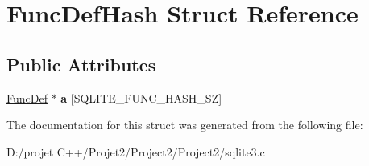 \hypertarget{struct_func_def_hash}{}\section{Func\+Def\+Hash Struct Reference}
\label{struct_func_def_hash}
\subsection*{Public Attributes}
\begin{DoxyCompactItemize}
\item 
\mbox{\label{struct_func_def_hash_aaab2cd9c5f40d92c236f8fdeb2d9849a}} 
\mbox{\hyperlink{struct_func_def}{Func\+Def}} $\ast$ {\bfseries a} \mbox{[}S\+Q\+L\+I\+T\+E\+\_\+\+F\+U\+N\+C\+\_\+\+H\+A\+S\+H\+\_\+\+SZ\mbox{]}
\end{DoxyCompactItemize}


The documentation for this struct was generated from the following file\+:\begin{DoxyCompactItemize}
\item 
D\+:/projet C++/\+Projet2/\+Project2/\+Project2/sqlite3.\+c\end{DoxyCompactItemize}
